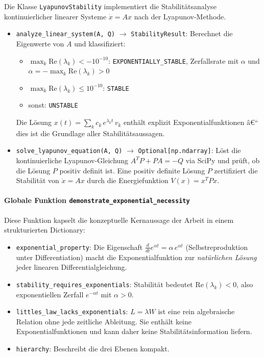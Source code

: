 ﻿\documentclass[a4paper,12pt]{report}
\theoremstyle{definition}
\begin{document}
Die Klasse \texttt{LyapunovStability} implementiert die
Stabilitätsanalyse kontinuierlicher linearer Systeme
$\dot{x} = Ax$ nach der Lyapunov-Methode.

\begin{itemize}
	\item \texttt{analyze\_linear\_system(A, Q)} $\to$
	\texttt{StabilityResult}:  Berechnet die Eigenwerte von $A$
	und klassifiziert:
	\begin{itemize}
		\item $\max_k \text{Re}(\lambda_k) < -10^{-10}$:
		\texttt{EXPONENTIALLY\_STABLE}, Zerfallsrate mit $\alpha$ und
		$\alpha = -\max_k \text{Re}(\lambda_k) > 0$
		\item $\max_k \text{Re}(\lambda_k) \leq 10^{-10}$:
		\texttt{STABLE}
		\item sonst: \texttt{UNSTABLE}
	\end{itemize}
	Die Lösung $x(t) = \sum_k c_k\, e^{\lambda_k t}\, v_k$
	enthält explizit Exponentialfunktionen â€“ dies ist die
	Grundlage aller Stabilitätsaussagen.
	
	\item \texttt{solve\_lyapunov\_equation(A, Q)} $\to$
	\texttt{Optional[np.ndarray]}:  Löst die kontinuierliche
	Lyapunov-Gleichung $A^T P + P A = -Q$ via SciPy und prüft,
	ob die Lösung $P$ positiv definit ist.  Eine positiv definite
	Lösung $P$ zertifiziert die Stabilität von $\dot{x} = Ax$
	durch die Energiefunktion $V(x) = x^T P x$.
\end{itemize}

\paragraph{Globale Funktion \texttt{demonstrate\_exponential\_necessity}}

Diese Funktion kapselt die konzeptuelle Kernaussage der Arbeit in
einem strukturierten Dictionary:

\begin{itemize}
	\item \texttt{exponential\_property}: Die Eigenschaft
	$\frac{d}{dt}e^{\alpha t} = \alpha\,e^{\alpha t}$
	(Selbstreproduktion unter Differentiation) macht die
	Exponentialfunktion zur \emph{natürlichen Lösung} jeder
	linearen Differentialgleichung.
	\item \texttt{stability\_requires\_exponentials}: Stabilität
	bedeutet $\text{Re}(\lambda_k) < 0$, also exponentiellen
	Zerfall $e^{-\alpha t}$ mit $\alpha > 0$.
	\item \texttt{littles\_law\_lacks\_exponentials}: $L = \lambda W$
	ist eine rein algebraische Relation ohne jede zeitliche
	Ableitung.  Sie enthält keine Exponentialfunktionen und
	kann daher keine Stabilitätsinformation liefern.
	\item \texttt{hierarchy}: Beschreibt die drei Ebenen kompakt.
\end{itemize}
\end{document}
